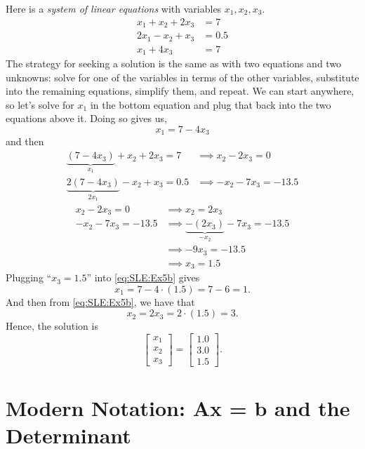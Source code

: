 \documentclass[letterpaper]{book}
\begin{document}
Here is a \textit{system of linear equations} with variables $x_1, x_2, x_3$. 
\begin{equation}
\label{eq:SLE:Ex5}
\begin{aligned}
x_1+x_2+2x_3 &=7 \\
2x_1-x_2+x_3&=0.5\\
x_1 + 4 x_3 &=7
\end{aligned}
\end{equation}
The strategy for seeking a solution is the same as with two equations and two unknowns: solve for one of the variables in terms of the other variables, substitute into the remaining equations, simplify them, and repeat. We can start anywhere, so let's solve for $x_1$ in the bottom equation and plug that back into the two equations above it. Doing so gives us,
\begin{equation}
\label{eq:SLE:Ex5b}
   x_1 = 7 - 4 x_3 
\end{equation}
and then 
\begin{align*}
\underbrace{( 7 - 4x_3)}_{x_1} +x_2+ 2x_3 =7 & \implies x_2  - 2 x_3 = 0 \\
\underbrace{2( 7 - 4x_3)}_{2 x_1}-x_2+x_3=0.5 & \implies -x_2 -7 x_3 = -13.5
\end{align*}
\begin{align}
\label{eq:SLE:Ex5c}
 x_2  - 2 x_3 = 0 &\implies x_2 = 2 x_3\\
 -x_2 -7 x_3 = -13.5 & \implies \underbrace{-(2 x_3)}_{-x_2}-7x_3 = -13.5 \nonumber \\
 & \implies - 9 x_3 = -13.5  \nonumber\\
 &\implies x_3 = 1.5 \nonumber
\end{align}
Plugging ``$x_3=1.5$'' into \eqref{eq:SLE:Ex5b} gives $$x_1=7-4\cdot (1.5)=7-6=1.$$ 
And then from \eqref{eq:SLE:Ex5b}, we have that
$$x_2 = 2 x_3 = 2 \cdot (1.5) = 3. $$
Hence, the solution is
\begin{equation}
    \begin{bmatrix} x_1 \\ x_2 \\ x_3 \end{bmatrix} = \left[\begin{array}{l}
1.0 \\ 3.0 \\ 1.5
\end{array}  \right].
\end{equation}

\setcounter{chapter}{2}
\setcounter{section}{-1}
\section{Modern Notation: Ax = b and the Determinant}
\end{document}
